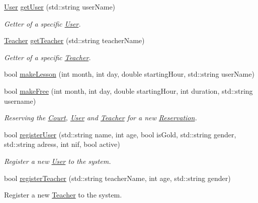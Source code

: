 \begin{DoxyCompactItemize}
\mbox{\hyperlink{class_user}{User}} \mbox{\hyperlink{class_company_a1f222b5e97b060c0603c42e64d7567a6}{get\+User}} (std\+::string user\+Name)
\begin{DoxyCompactList}\small\item\em Getter of a specific \mbox{\hyperlink{class_user}{User}}. \end{DoxyCompactList}\item 
\mbox{\hyperlink{class_teacher}{Teacher}} \mbox{\hyperlink{class_company_a166411c9ee427d89abd9349191434fbf}{get\+Teacher}} (std\+::string teacher\+Name)
\begin{DoxyCompactList}\small\item\em Getter of a specific \mbox{\hyperlink{class_teacher}{Teacher}}. \end{DoxyCompactList}\item 
bool \mbox{\hyperlink{class_company_a88745d2eaf511e686eccfa14601a302b}{make\+Lesson}} (int month, int day, double starting\+Hour, std\+::string user\+Name)
\item 
bool \mbox{\hyperlink{class_company_a56fa75dd66690eae0853a3f3278220e3}{make\+Free}} (int month, int day, double starting\+Hour, int duration, std\+::string username)
\begin{DoxyCompactList}\small\item\em Reserving the \mbox{\hyperlink{class_court}{Court}}, \mbox{\hyperlink{class_user}{User}} and \mbox{\hyperlink{class_teacher}{Teacher}} for a new \mbox{\hyperlink{class_reservation}{Reservation}}. \end{DoxyCompactList}\item 
bool \mbox{\hyperlink{class_company_af58211dba6c7fa61b81648145dbb165e}{register\+User}} (std\+::string name, int age, bool is\+Gold, std\+::string gender, std\+::string adress, int nif, bool active)
\begin{DoxyCompactList}\small\item\em Register a new \mbox{\hyperlink{class_user}{User}} to the system. \end{DoxyCompactList}\item 
bool \mbox{\hyperlink{class_company_afd7f0c326672c6bb6a23d5921503bc0d}{register\+Teacher}} (std\+::string teacher\+Name, int age, std\+::string gender)
\begin{DoxyCompactList}\small\item\em 
\begin{DoxyItemize}
\item Register a new \mbox{\hyperlink{class_teacher}{Teacher}} to the system. 

\end{DoxyItemize}
\end{DoxyCompactList}
\end{DoxyCompactItemize}

